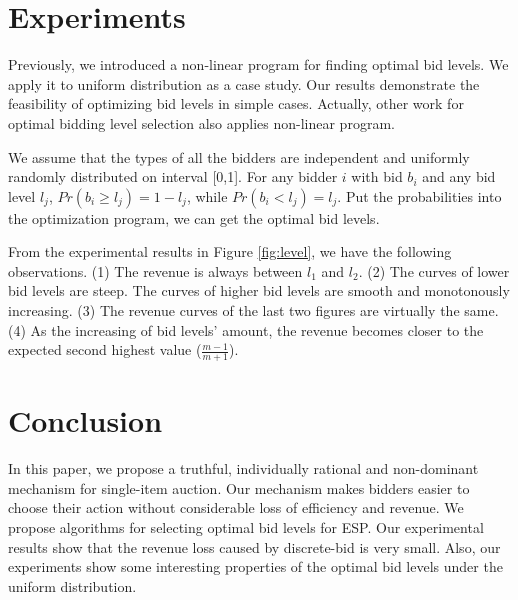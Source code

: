 \documentclass[letterpaper]{article}
\begin{document}
\section{Experiments}

Previously, we introduced a non-linear program for finding optimal bid levels.
We apply it to uniform distribution as a case study.
Our results demonstrate the feasibility of optimizing bid levels in simple cases.
Actually, other work for optimal bidding level selection also applies non-linear program\cite{li2011revenue}.

We assume that the types of all the bidders are independent and uniformly randomly distributed on interval [0,1].
For any bidder $i$ with bid $b_i$ and any bid level $l_j$, $Pr(b_i\geq l_j)=1-l_j$, while $Pr(b_i<l_j)=l_j$.
Put the probabilities into the optimization program, we can get the optimal bid levels.


From the experimental results in Figure \ref{fig:level}, we have the following observations.
(1) The revenue is always between $l_1$ and $l_2$. 
(2) The curves of lower bid levels are steep. The curves of higher bid levels are smooth and monotonously increasing.
(3) The revenue curves of the last two figures are virtually the same.
(4) As the increasing of bid levels' amount, the revenue becomes closer to the expected second highest value ($\frac{m-1}{m+1}$). 



\section{Conclusion}
In this paper, we propose a truthful, individually rational and non-dominant mechanism for single-item auction.
Our mechanism makes bidders easier to choose their action without considerable loss of efficiency and revenue.
We propose algorithms for selecting optimal bid levels for ESP.
Our experimental results show that the revenue loss caused by discrete-bid is very small.
Also, our experiments show some interesting properties of the optimal bid levels under the uniform distribution.


\newpage


\end{document}
